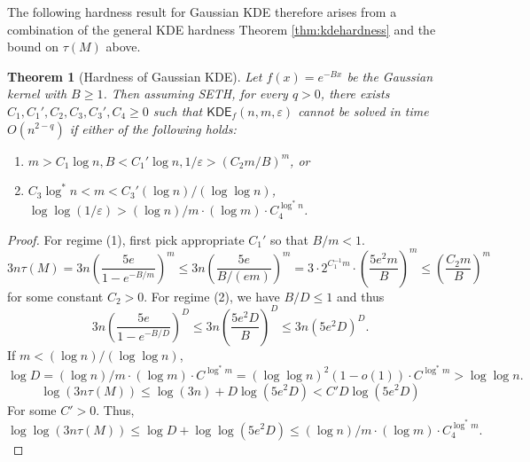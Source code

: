 \documentclass[10pt,a4paper]{article}
\newtheorem{theorem}{Theorem}
\theoremstyle{remark}
\numberwithin{equation}{section}
\numberwithin{theorem}{section}
\newcommand{\eps}{\varepsilon}
\newcommand{\KDE}{\mathsf{KDE}}
\begin{document}
The following hardness result for Gaussian KDE therefore arises from a combination of the general KDE hardness Theorem \ref{thm:kdehardness} and the bound on $\tau(M)$ above.
\begin{theorem}[Hardness of Gaussian KDE]
Let $f(x) = e^{-Bx}$ be the Gaussian kernel with $B \ge 1$.
Then assuming SETH, for every $q > 0$, there exists $C_1, C_1', C_2, C_3, C_3', C_4 \ge 0$ such that $\KDE_f(n, m, \eps)$ cannot be solved in time $O(n^{2-q})$ if either of the following holds:
\begin{enumerate}[(1)]
\item $m > C_1\log n, B < C_1'\log n, 1/\eps > (C_2m/B)^m$, or
\item $C_3\log^* n < m < C_3'(\log n)/(\log\log n)$, $\log\log(1/\eps) > (\log n)/m \cdot (\log m) \cdot C_4^{\log^*n}$.
\end{enumerate}
\end{theorem}
\begin{proof}
For regime (1), first pick appropriate $C_1'$ so that $B/m < 1$.
\[3n\tau(M) = 3n\left(\frac{5e}{1 - e^{-B/m}}\right)^m \le 3n\left(\frac{5e}{B/(em)}\right)^m
=3 \cdot 2^{C_1^{-1}m} \cdot \left(\frac {5e^2m}B\right)^m \le \left(\frac {C_2m}B\right)^m\]
for some constant $C_2 > 0$.
For regime (2), we have $B/D \le 1$ and thus
\[3n\left(\frac{5e}{1 - e^{-B/D}}\right)^D \le 3n\left(\frac{5e^2D}{B}\right)^D \le 3n(5e^2D)^D.\]
If $m < (\log n)/(\log \log n)$,
\[\log D = (\log n)/m \cdot (\log m) \cdot C^{\log^* m}
= (\log\log n)^2(1 - o(1)) \cdot C^{\log^* m} > \log \log n.\]
\[\log(3n\tau(M)) \le \log(3n) + D\log(5e^2D) < C'D\log(5e^2D)\]
For some $C' > 0$. Thus,
\[\log \log(3n\tau(M)) \le \log D + \log\log(5e^2D) \le (\log n)/m \cdot (\log m) \cdot C_4^{\log^* m}.\]

\end{proof}
\end{document}
